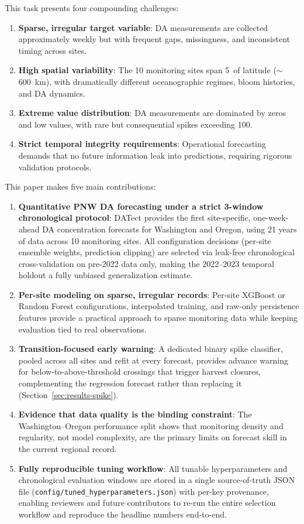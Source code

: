 \documentclass[toxins,article,submit,moreauthors]{Definitions/mdpi}
\begin{document}
This task presents four compounding challenges:
\begin{enumerate}[nosep]
    \item \textbf{Sparse, irregular target variable}: DA measurements are collected approximately weekly but with frequent gaps, missingness, and inconsistent timing across sites.
    \item \textbf{High spatial variability}: The 10 monitoring sites span 5\textdegree\ of latitude ($\sim$\SI{600}{\kilo\meter}), with dramatically different oceanographic regimes, bloom histories, and DA dynamics.
    \item \textbf{Extreme value distribution}: DA measurements are dominated by zeros and low values, with rare but consequential spikes exceeding \SI{100}{\microgrampeg}.
    \item \textbf{Strict temporal integrity requirements}: Operational forecasting demands that no future information leak into predictions, requiring rigorous validation protocols.
\end{enumerate}

This paper makes five main contributions:
\begin{enumerate}[nosep]
    \item \textbf{Quantitative PNW DA forecasting under a strict 3-window chronological protocol}: DATect provides the first site-specific, one-week-ahead DA concentration forecasts for Washington and Oregon, using 21 years of data across 10 monitoring sites. All configuration decisions (per-site ensemble weights, prediction clipping) are selected via leak-free chronological cross-validation on pre-2022 data only, making the 2022--2023 temporal holdout a fully unbiased generalization estimate.
    \item \textbf{Per-site modeling on sparse, irregular records}: Per-site XGBoost or Random Forest configurations, interpolated training, and raw-only persistence features provide a practical approach to sparse monitoring data while keeping evaluation tied to real observations.
    \item \textbf{Transition-focused early warning}: A dedicated binary spike classifier, pooled across all sites and refit at every forecast, provides advance warning for below-to-above-threshold crossings that trigger harvest closures, complementing the regression forecast rather than replacing it (Section~\ref{sec:results-spike}).
    \item \textbf{Evidence that data quality is the binding constraint}: The Washington--Oregon performance split shows that monitoring density and regularity, not model complexity, are the primary limits on forecast skill in the current regional record.
    \item \textbf{Fully reproducible tuning workflow}: All tunable hyperparameters and chronological evaluation windows are stored in a single source-of-truth JSON file (\texttt{config/tuned\_hyperparameters.json}) with per-key provenance, enabling reviewers and future contributors to re-run the entire selection workflow and reproduce the headline numbers end-to-end.
\end{enumerate}
\end{document}
